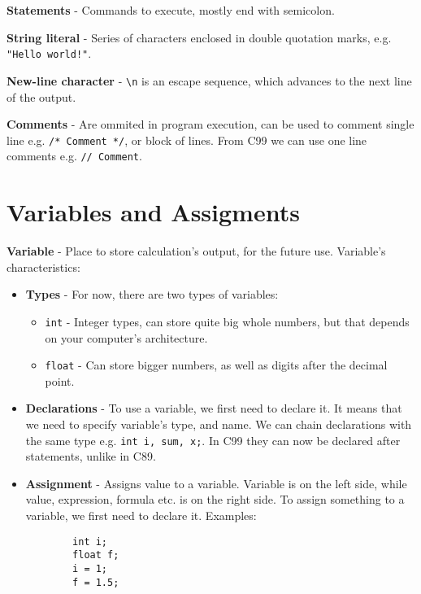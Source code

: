 \documentclass[openany]{book}
\begin{document}
    \textbf{Statements} - Commands to execute, mostly end with semicolon.

    \bigskip
    \textbf{String literal} - Series of characters enclosed in double quotation marks, e.g. \texttt{"Hello world!"}.

    \textbf{New-line character} - \texttt{\textbackslash n} is an escape sequence, which advances to the next line of the output.

    \textbf{Comments} - Are ommited in program execution, can be used to comment single line e.g. \texttt{/* Comment */}, or block of lines. From C99 we can use one line comments e.g. \texttt{// Comment}.

    \section{Variables and Assigments}

    \textbf{Variable} - Place to store calculation's output, for the future use.
    Variable's characteristics:
    \begin{itemize}
        \item 
        \textbf{Types} - For now, there are two types of variables:
        \begin{itemize}
            \item \texttt{int} - Integer types, can store quite big whole numbers, but that depends on your computer's architecture.
            \item \texttt{float} - Can store bigger numbers, as well as digits after the decimal point.
        \end{itemize}

        \item 
        \textbf{Declarations} - To use a variable, we first need to declare it. It means that we need to specify variable's type, and name. We can chain declarations with the same type e.g. \texttt{int i, sum, x;}. In C99 they can now be declared after statements, unlike in C89.
        
        \item
        \textbf{Assignment} - Assigns value to a variable. Variable is on the left side, while value, expression, formula etc. is on the right side. To assign something to a variable, we first need to declare it. Examples:
        \begin{lstlisting}
        int i;
        float f;
        i = 1;
        f = 1.5;
        \end{lstlisting}
    \end{itemize}
\end{document}
